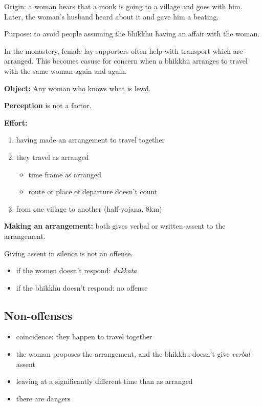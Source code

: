 Origin: a woman hears that a monk is going to a village and goes with
him. Later, the woman's husband heard about it and gave him a beating.

Purpose: to avoid people assuming the bhikkhu having an affair with the
woman.

In the monastery, female lay supporters often help with transport which
are arranged. This becomes casuse for concern when a bhikkhu arranges to
travel with the same woman again and again.

\textbf{Object:} Any woman who knows what is lewd.

\textbf{Perception} is not a factor.

\textbf{Effort:}

\begin{enumerate}
\def\labelenumi{\arabic{enumi}.}
\tightlist
\item
  having made an arrangement to travel together
\item
  they travel as arranged

  \begin{itemize}
  \tightlist
  \item
    time frame as arranged
  \item
    route or place of departure doesn't count
  \end{itemize}
\item
  from one village to another (half-yojana, 8km)
\end{enumerate}

\textbf{Making an arrangement:} both gives verbal or written assent to
the arrangement.

Giving assent in silence is not an offense.

\begin{itemize}
\tightlist
\item
  if the women doesn't respond: \emph{dukkata}
\item
  if the bhikkhu doesn't respond: no offense
\end{itemize}

\subsection{Non-offenses}

\begin{itemize}
\tightlist
\item
  coincidence: they happen to travel together
\item
  the woman proposes the arrangement, and the bhikkhu doesn't give
  \emph{verbal} assent
\item
  leaving at a significantly different time than as arranged
\item
  there are dangers
\end{itemize}

